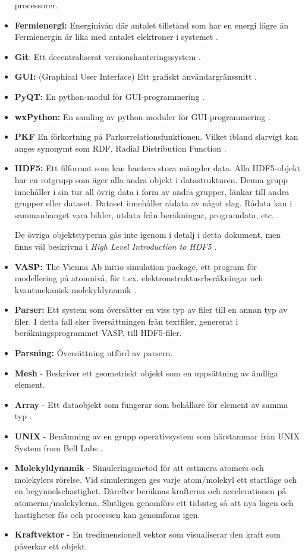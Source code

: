 \documentclass[10pt,oneside,swedish]{article}
\begin{document}
\begin{itemize}
  processorer.
\item
  \textbf{Fermienergi:} Energinivån där antalet tillstånd som har en
  energi lägre än Fermienergin är lika med antalet elektroner i systemet
  \cite{Fermi-energi}.
\item
  \textbf{Git}: Ett decentraliserat versionshanteringssystem
  \cite{Git}.
\item
  \textbf{GUI:} (Graphical User Interface) Ett grafiskt
  användargränssnitt \cite{GUI}.
\item
  \textbf{PyQT:} En python-modul för GUI-programmering \cite{PyQT}.
\item
  \textbf{wxPython:} En samling av python-moduler för GUI-programmering
  \cite{wxPython}.
\item
  \textbf{PKF} En förkortning på Parkorrelationsfunktionen. Vilket
  ibland slarvigt kan anges synonymt som RDF, Radial Distribution
  Function \cite{RadialDistributionFunction}.
\item
  \textbf{HDF5:} Ett filformat som kan hantera stora mängder data. Alla
  HDF5-objekt har en rotgrupp som äger alla andra objekt i
  datastrukturen. Denna grupp innehåller i sin tur all övrig data i form
  av andra grupper, länkar till andra grupper eller dataset. Dataset
  innehåller rådata av något slag. Rådata kan i sammanhanget vara
  bilder, utdata från beräkningar, programdata, etc. \cite{HDFGroup}\cite{HDFGroup2}.

  De övriga objektstyperna gås inte igenom i detalj i detta dokument,
  men finns väl beskrivna i \emph{High Level Introduction to HDF5}
  \cite{HDFGroup2}.
\item
  \textbf{VASP:} The Vienna Ab initio simulation package, ett program
  för modellering på atomnivå, för t.ex. elektronstruktusrberäkningar
  och kvantmekanisk molekyldynamik \cite{VASP}.
\item
  \textbf{Parser:} Ett system som översätter en viss typ av filer till
  en annan typ av filer. I detta fall sker översättningen från
  textfiler, genererat i beräkningsprogrammet VASP, till HDF5-filer.
\item
  \textbf{Parsning:} Översättning utförd av parsern.
\item
  \textbf{Mesh} - Beskriver ett geometriskt objekt som en uppsättning av
  ändliga element.
\item
  \textbf{Array} - Ett dataobjekt som fungerar som behållare för element
  av samma typ \cite{WhatIsArray}.
\item
  \textbf{UNIX} - Benämning av en grupp operativsystem som härstammar
  från UNIX System from Bell Labs \cite{WhatIsUNIX}.
\item
     \textbf{Molekyldynamik} - Simuleringsmetod för att estimera atomers och molekylers rörelse. Vid simuleringen ges varje atom/molekyl ett startläge och en begynnelsehastighet. Därefter beräknas krafterna och accelerationen på atomerna/molekylerna. Slutligen genomförs ett tidssteg så att nya lägen och hastigheter fås och processen kan genomföras igen.   \cite{Molekyldynamik}
\item
    \textbf{Kraftvektor} - En tredimensionell vektor som visualiserar den kraft som påverkar ett objekt.

\end{itemize}
\end{document}

